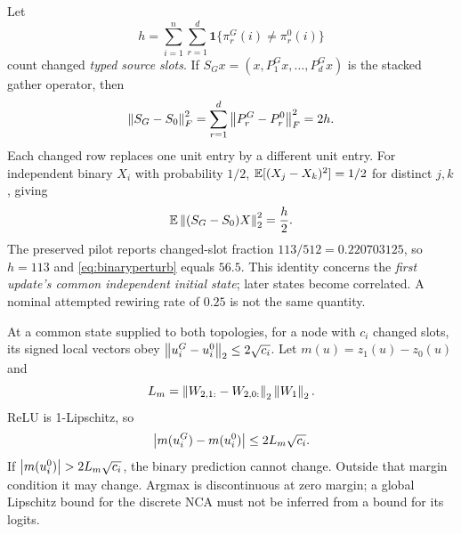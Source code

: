 Let
\begin{equation}
 h=\sum_{i=1}^n\sum_{r=1}^{d}
       \mathbf1\{\pi_r^G(i)\ne\pi_r^0(i)\}
\end{equation}
count changed \emph{typed source slots}. If
$S_Gx=(x,P_1^Gx,\ldots,P_d^Gx)$ is the stacked gather operator, then
\begin{equation}
 \left\lVert S_G-S_0\right\rVert_F^2
 =\sum_{r=1}^d\left\lVert P_r^G-P_r^0\right\rVert_F^2=2h.
 \label{eq:gatherfrobenius}
\end{equation}
Each changed row replaces one unit entry by a different unit entry.
For independent binary $X_i$ with probability $1/2$,
$\mathbb{E}[(X_j-X_k)^2]=1/2$ for distinct $j,k$, giving
\begin{equation}
 \mathbb{E}\left\lVert (S_G-S_0)X\right\rVert_2^2=\frac h2.
 \label{eq:binaryperturb}
\end{equation}
The preserved pilot reports changed-slot fraction $113/512=0.220703125$,
so $h=113$ and \eqref{eq:binaryperturb} equals $56.5$.
This identity concerns the \emph{first update's common independent initial
state}; later states become correlated. A nominal attempted rewiring rate
of $0.25$ is not the same quantity.

At a common state supplied to both topologies, for a node with $c_i$
changed slots, its signed local vectors
obey $\left\lVert u_i^G-u_i^0\right\rVert_2\leq2\sqrt{c_i}$. Let
$m(u)=z_1(u)-z_0(u)$ and
\[
 L_m=\left\lVert W_{2,1:}-W_{2,0:}\right\rVert_2\left\lVert W_1\right\rVert_2.
\]
ReLU is 1-Lipschitz, so
\begin{equation}
 \left\lvert m(u_i^G)-m(u_i^0)\right\rvert\leq2L_m\sqrt{c_i}.
\end{equation}
If $\left\lvert m(u_i^0)\right\rvert>2L_m\sqrt{c_i}$, the binary prediction cannot change.
Outside that margin condition it may change. Argmax is discontinuous at
zero margin; a global Lipschitz bound for the discrete NCA must not be
inferred from a bound for its logits.

